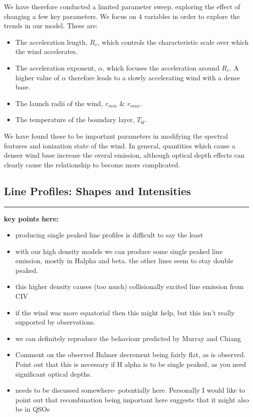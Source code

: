 \documentclass[preprint, a4paper, 11pt]{aastex}
\begin{document}
We have therefore conducted a limited parameter 
sweep, exploring the effect of changing a few key parameters.  We focus on 
4 variables in order to explore the trends in our model. These are:

\begin{itemize}
 	\item  The acceleration length, $R_v$, which controls the characteristic scale
 	over which the wind accelerates.
 	\item The acceleration exponent, $\alpha$, which focuses the acceleration
 	around $R_v$. A higher value of $\alpha$ therefore leads to a slowly accelerating 
 	wind with a dense base.
 	\item The launch radii of the wind, $r_{min}$ \& $r_{max}$.
 	\item The temperature of the boundary layer, $T_{bl}$.
 \end{itemize} 

We have found these to be important parameters in modifying 
the spectral features and ionization state of the wind.
In general, quantities which cause a denser wind base increase
the overal emission, although optical depth effects can clearly cause 
the relationship to become more complicated. 



\subsection{Line Profiles: Shapes and Intensities}

\noindent\rule{16cm}{0.4pt}

{\bf
\noindent key points here:

\begin{itemize}
	\item producing single peaked line profiles is difficult to say the least
	\item with our high density models we can produce some single peaked line emission,
	mostly in Halpha and beta. the other lines seem to stay double peaked.
	\item this higher density causes (too much) collisionally excited line emission from CIV
	\item if the wind was more equatorial then this might help, but this isn't really supported by observations.
	\item we can definitely reproduce the behaviour predicted by Murray and Chiang
	\item Comment on the observed Balmer decrement being fairly flat, as is observed. Point out that
	this is necessary if H alpha is to be single peaked, as you need significant optical depths.
	\item \la needs to be discussed somewhere- potentially here. Personally I would like to point out
	that recombination being important here suggests that it might also be in QSOs
\end{itemize}
}
\end{document}
